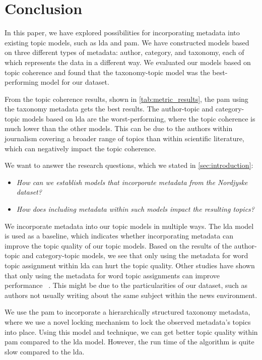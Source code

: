 \section{Conclusion}\label{sec:conclusion}
In this paper, we have explored possibilities for incorporating metadata into existing topic models, such as \gls{lda} and \gls{pam}.
We have constructed models based on three different types of metadata: author, category, and taxonomy, each of which represents the data in a different way.
We evaluated our models based on topic coherence and found that the taxonomy-topic model was the best-performing model for our dataset.

From the topic coherence results, shown in \autoref{tab:metric_results}, the \acrfull{pam} using the taxonomy metadata gets the best results.
The author-topic and category-topic models based on \gls{lda} are the worst-performing, where the topic coherence is much lower than the other models. 
This can be due to the authors within journalism covering a broader range of topics than within scientific literature, which can negatively impact the topic coherence.

We want to answer the research questions, which we stated in \autoref{sec:introduction}:

\begin{itemize}	
    \item \textit{How can we establish models that incorporate metadata from the Nordjyske dataset?}	
    \item \textit{How does including metadata within such models impact the resulting topics?}
 \end{itemize}

We incorporate metadata into our topic models in multiple ways.
The \gls{lda} model is used as a baseline, which indicates whether incorporating metadata can improve the topic quality of our topic models.
Based on the results of the author-topic and category-topic models, we see that only using the metadata for word topic assignment within \gls{lda} can hurt the topic quality.
Other studies have shown that only using the metadata for word topic assignments can improve performance~\cite{MetaLDA2017} \cite{author_topic_2012}.
This might be due to the particularities of our dataset, such as authors not usually writing about the same subject within the news environment.  


We use the \gls{pam} to incorporate a hierarchically structured taxonomy metadata, where we use a novel locking mechanism to lock the observed metadata's topics into place.
Using this model and technique, we can get better topic quality within \gls{pam} compared to the \gls{lda} model.
However, the run time of the algorithm is quite slow compared to the \gls{lda}.

